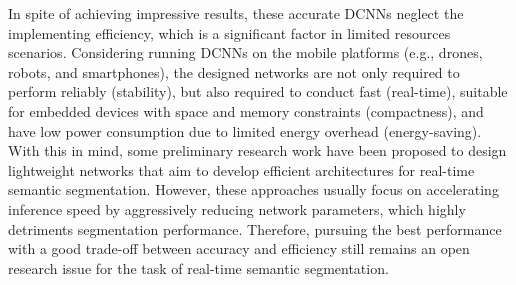 \documentclass[runningheads]{llncs}
\begin{document}
In spite of achieving impressive results, these accurate DCNNs neglect the implementing efficiency, which is a significant factor in limited resources scenarios. Considering running DCNNs on the mobile platforms (e.g., drones, robots, and smartphones), the designed networks are not only required to perform reliably (stability), but also required to conduct fast (real-time), suitable for embedded devices with space and memory constraints (compactness), and have low power consumption due to limited energy overhead (energy-saving). With this in mind, some preliminary research work \cite{wu2018cgnet,Treml2016speeding,Paszke2016enet,Mehta2018espnet} have been proposed to design lightweight networks that aim to develop efficient architectures for real-time semantic segmentation. However, these approaches usually focus on accelerating inference speed by aggressively reducing network parameters, which highly detriments segmentation performance. Therefore, pursuing the best performance with a good trade-off between accuracy and efficiency still remains an open research issue for the task of real-time semantic segmentation.
\end{document}

